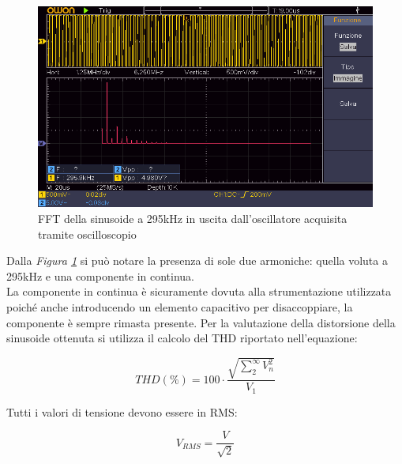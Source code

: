 \documentclass[titlepage]{report}
\begin{document}
	\begin{figure}[h]
		\centering
		\includegraphics[scale=0.9]{Immagini/009_OscillatoreWienFFT.png}
		\caption{FFT della sinusoide a 295kHz in uscita dall'oscillatore acquisita tramite oscilloscopio}
		\label{fig:FFT295k}
	\end{figure}
	
	Dalla \textit{Figura \ref{fig:FFT295k}} si può notare la presenza di sole due armoniche: quella voluta a 295kHz e una componente in continua. \\
	La componente in continua è sicuramente dovuta alla strumentazione utilizzata poiché anche introducendo un elemento capacitivo per disaccoppiare, la componente è sempre rimasta presente.
	Per la valutazione della distorsione della sinusoide ottenuta si utilizza il calcolo del THD riportato nell'equazione:
	
	\begin{equation}
		\label{eq:thd}
		THD (\%) = 100 \cdot \frac{\sqrt{\sum_{2}^{\infty} V_{n}^2}}{V_1}
	\end{equation}

	Tutti i valori di tensione devono essere in RMS: 
	
	\begin{equation}
		\label{eq:Vrms}
		V_{RMS} = \frac{V}{\sqrt{2}}
	\end{equation}


	
	
\end{document}
